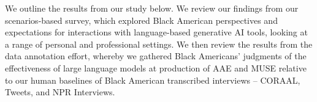 

We outline the results from our study below. We review our findings from our scenarios-based survey, which explored Black American perspectives and expectations for interactions with language-based generative AI tools, looking at a range of personal and professional settings. We then review the results from the data annotation effort, whereby we gathered Black Americans' judgments of the effectiveness of large language models at production of AAE and MUSE relative to our human baselines of Black American transcribed interviews -- CORAAL, Tweets, and NPR Interviews. 






